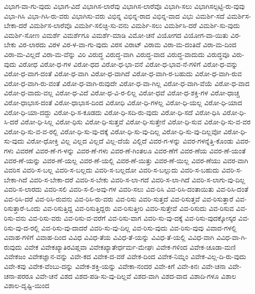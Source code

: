 {ವಿಭಾಗ-ವಾ-ಗು-ವುದು
ವಿಭಾಗ-ವಿದೆ
ವಿಭಾಗಿಸ-ಲಾರೆವು
ವಿಭಾಗಿಸ-ಲಾರೆವೊ
ವಿಭಾಗಿ-ಸಲು
ವಿಭಾಗಿಸಲ್ಪಟ್ಟಿ-ರು-ವುವು
ವಿಭಾ-ಗಿಸಿ
ವಿಭಾ-ಗಿಸಿ-ರು-ವರು
ವಿಭಾಗಿಸು-ವರು
ವಿಭಿನ್ನ
ವಿಭಿನ್ನ-ರಾದ
ವಿಭಿನ್ನ-ವಾದ
ವಿಭು
ವಿಮರ್ಶಿ-ಸದೆ
ವಿಮರ್ಶಿಸ-ಬೇಕಾ-ದರೆ
ವಿಮರ್ಶಿಸ-ಲಾರೆವೊ
ವಿಮರ್ಶಿ-ಸಲಿಚ್ಛಿ-ಸು-ವನು
ವಿಮರ್ಶಿ-ಸಲು
ವಿಮರ್ಶಿಸಿ-ದರೆ
ವಿಮರ್ಶಿ-ಸು-ವುದು
ವಿಮರ್ಶಿ-ಸೋಣ
ವಿಮರ್ಶೆ
ವಿಮರ್ಶೆಗೂ
ವಿಮರ್ಶೆ-ಮಾಡಿ
ವಿಮೋ-ಚನೆ
ವಿಯೋಗದ
ವಿಯೋಗ-ವಾ-ಯಿತು
ವಿರ-ಬೇಕು
ವಿರ-ಲಾರದು
ವಿರಳ
ವಿರ-ಳ-ವಾ-ಗು-ವುದು
ವಿರಸ
ವಿರಾಟ್
ವಿರಾಮ
ವಿರಾ-ಮ-ದಂತಿದೆ
ವಿರಾ-ಮ-ದಿಂದ
ವಿರಾ-ಮ-ವಿಲ್ಲದೆ
ವಿರಾ-ಮ-ವೆನ್ನು
ವಿರಿ
ವಿರುದ್ಧ
ವಿರುದ್ಧ-ವಾಗಿ
ವಿರುದ್ಧ-ವಾದ
ವಿರುದ್ಧ-ವಾದುದು
ವಿರುದ್ಧವೂ
ವಿರು-ವುದು
ವಿರೋಧ
ವಿರೋ-ಧ-ಗಳ
ವಿರೋ-ಧದ
ವಿರೋ-ಧ-ಭಾ-ವನೆ
ವಿರೋ-ಧ-ಭಾವ-ನೆ-ಗಳಿಗೆ
ವಿರೋ-ಧ-ವನ್ನು
ವಿರೋ-ಧ-ವಾಗ-ದಂತೆ
ವಿರೋ-ಧ-ವಾಗಿ
ವಿರೋ-ಧ-ವಾಗಿದೆ
ವಿರೋ-ಧ-ವಾಗಿ-ರ-ಬಹುದು
ವಿರೋ-ಧ-ವಾಗಿ-ರುವ
ವಿರೋ-ಧ-ವಾಗಿ-ರು-ವಂತೆ
ವಿರೋ-ಧ-ವಾಗಿ-ರುವುದೇ
ವಿರೋ-ಧ-ವಾ-ಗಿಲ್ಲ
ವಿರೋ-ಧ-ವಾಗಿ-ವೆಯೆ
ವಿರೋ-ಧ-ವಾದ
ವಿರೋ-ಧ-ವಾದು-ವಲ್ಲ
ವಿರೋ-ಧ-ವಿದೆ
ವಿರೋ-ಧ-ವಿ-ರ-ಲಿಲ್ಲ
ವಿರೋ-ಧವೆ
ವಿರೋ-ಧ-ಶಕ್ತಿ-ಗಳ
ವಿರೋ-ಧಾಚ್ಚ
ವಿರೋ-ಧಾಭಾಸ-ದಂತೆ
ವಿರೋ-ಧಾಭಾಸ-ದಿಂದ
ವಿರೋಧಿ
ವಿರೋ-ಧಿ-ಗಳಲ್ಲ
ವಿರೋ-ಧಿ-ಯಲ್ಲ
ವಿರೋ-ಧಿ-ಯಾದ
ವಿರೋ-ಧಿ-ಯಾ-ದದ್ದು
ವಿರೋ-ಧಿ-ಸ-ಕೂಡದು
ವಿರೋ-ಧಿ-ಸದಿ-ರು-ವುದು
ವಿರೋ-ಧಿ-ಸದೆ
ವಿರೋ-ಧಿಸಿ
ವಿರೋ-ಧಿ-ಸಿ-ದರೆ
ವಿರೋ-ಧಿ-ಸಿಲ್ಲ
ವಿರೋ-ಧಿಸು
ವಿರೋ-ಧಿ-ಸುತ್ತವೆ
ವಿರೋ-ಧಿ-ಸುತ್ತೇನೆ
ವಿರೋ-ಧಿ-ಸುವ
ವಿರೋ-ಧಿ-ಸು-ವ-ವರ
ವಿರೋ-ಧಿ-ಸು-ವ-ವ-ರಲ್ಲಿ
ವಿರೋ-ಧಿ-ಸು-ವು-ದಕ್ಕೆ
ವಿರೋ-ಧಿ-ಸು-ವು-ದಿಲ್ಲ
ವಿರೋ-ಧಿ-ಸು-ವು-ದಿಲ್ಲವೋ
ವಿರೋ-ಧಿ-ಸು-ವುದು
ವಿರೋ-ಧೋಕ್ತಿ
ವಿಲ್ಲ
ವಿಲ್ಲದ
ವಿಲ್ಲದೆ
ವಿಲ್ಲ-ದೆಯೆ
ವಿಲ್ಲಿದೆ
ವಿವರ-ಗ-ಳನ್ನು
ವಿವರ-ಗಳನ್ನೆತ್ತಿ-ಕೊಂಡು
ವಿವರ-ಗಳು
ವಿವರಣೆ
ವಿವರ-ಣೆ-ಗ-ಳನ್ನು
ವಿವರ-ಣೆ-ಗಳು
ವಿವರ-ಣೆ-ಗಿಂತಲೂ
ವಿವರ-ಣೆಗೆ
ವಿವರ-ಣೆಯ
ವಿವರ-ಣೆ-ಯಂತೆ
ವಿವರ-ಣೆ-ಯನ್ನು
ವಿವರ-ಣೆ-ಯಲ್ಲ
ವಿವರ-ಣೆ-ಯಲ್ಲಿ
ವಿವರ-ಣೆ-ಯಿತ್ತು
ವಿವರ-ಣೆ-ಯಿಲ್ಲ
ವಿವರ-ಣೆಯು
ವಿವರ-ವಾಗಿ
ವಿವರಿಸ
ವಿವರಿ-ಸ-ಬಲ್ಲ
ವಿವರಿ-ಸ-ಬಲ್ಲದು
ವಿವರಿ-ಸ-ಬಲ್ಲದೋ
ವಿವರಿ-ಸ-ಬಲ್ಲುದು
ವಿವರಿ-ಸ-ಬಹುದು
ವಿವರಿ-ಸ-ಬೇಕಾ-ಗಿದೆ
ವಿವರಿ-ಸ-ಬೇಕಾ-ದರೆ
ವಿವರಿ-ಸ-ಬೇಕು
ವಿವರಿ-ಸ-ಲಾ-ಗದೆ
ವಿವರಿ-ಸ-ಲಾ-ಗಿದೆ
ವಿವರಿ-ಸ-ಲಾಗು-ವು-ದಿಲ್ಲ
ವಿವರಿ-ಸ-ಲಾರದು
ವಿವರಿ-ಸಲಿ
ವಿವರಿ-ಸ-ಲಿ-ಅವು-ಗಳ
ವಿವರಿ-ಸಲು
ವಿವ-ರಿಸಿ
ವಿವ-ರಿಸಿ-ದಂತಾಯಿತು
ವಿವ-ರಿಸಿ-ದಂತೆ
ವಿವ-ರಿಸಿ-ದರೆ
ವಿವ-ರಿಸಿ-ರುವನು
ವಿವ-ರಿಸಿ-ರು-ವರು
ವಿವ-ರಿಸು
ವಿವರಿ-ಸುತ್ತದೆ
ವಿವ-ರಿಸುತ್ತವೆ
ವಿವ-ರಿಸುತ್ತಾರೆ
ವಿವ-ರಿಸುತ್ತಾರೆ-ಒಂದು
ವಿವ-ರಿಸುತ್ತಿದ್ದ
ವಿವ-ರಿಸುತ್ತಿದ್ದರು
ವಿವ-ರಿಸುತ್ತೀರಿ
ವಿವರಿ-ಸುತ್ತೇವೆ
ವಿವ-ರಿಸುದು
ವಿವ-ರಿಸುವ
ವಿವ-ರಿಸು-ವನು
ವಿವ-ರಿಸು-ವರು
ವಿವ-ರಿಸು-ವ-ವರೆಗೆ
ವಿವ-ರಿಸು-ವಾಗ
ವಿವರಿ-ಸು-ವು-ದಕ್ಕೆ
ವಿವ-ರಿಸು-ವುದಕ್ಕೋಸ್ಕರ
ವಿವ-ರಿಸು-ವು-ದ-ರಲ್ಲಿ
ವಿವ-ರಿಸು-ವು-ದಾದರೆ
ವಿವರಿ-ಸು-ವು-ದಿಲ್ಲ
ವಿವ-ರಿಸು-ವುದು
ವಿವ-ರಿಸು-ವುವು
ವಿವಾದ-ಗಳಲ್ಲಿ
ವಿವಾಹ-ಗಳಿಗೆ
ವಿವಾಹ-ದಿಂದ
ವಿವಿಧ
ವಿವಿಧ-ತೆಯ
ವಿವಿಧ-ತೆ-ಯನ್ನು
ವಿವಿಧ-ತೆ-ಯಲ್ಲಿ
ವಿವಿಧ-ವಾಗಿ
ವಿವಿಧ-ವಾ-ಗಿ-ರುವುದು
ವಿವೇಕ
ವಿವೇಕಖ್ಯಾತಿರವಿಪ್ಲವಾ
ವಿವೇಕಖ್ಯಾತೇರ್ಧರ್ಮ-ಮೇಘಃ
ವಿವೇಕ-ಗಳಿಂದ
ವಿವೇಕ-ಚೂಡಾ-ಮಣಿ
ವಿವೇಕಜಂ
ವಿವೇಕಜ್ಞಾನ-ವನ್ನು
ವಿವೇ-ಕದ
ವಿವೇಕ-ದ-ವರೆ
ವಿವೇಕ-ದಿಂದ
ವಿವೇಕ-ನಿಮ್ನಂ
ವಿವೇಕ-ವಿಲ್ಲ-ದಿ-ರು-ವುದು
ವಿವೇ-ಕವು
ವಿವೇಕ-ವೆಂಬು-ದನ್ನು
ವಿವೇಕ-ಶಕ್ತಿ-ಯನ್ನು
ವಿವೇಕಾ-ನಂದರ
ವಿವೇ-ಕಿಗೆ
ವಿವೇ-ಕಿನಃ
ವಿವೇ-ಚನಾ
ವಿವೇ-ಚನಾ-ಪರರೂ
ವಿವೇ-ಚನೆ
ವಿಶದ
ವಿಶದ-ಪಡಿ-ಸು-ವು-ದಿಲ್ಲವೆ
ವಿಶದ-ವಾಗಿ
ವಿಶದ-ವಾದ
ವಿಶಾದಿ-ಗಳೂ
ವಿಶಾಲ
ವಿಶಾಲ-ದೃಷ್ಟಿ-ಯಿಂದ
}
